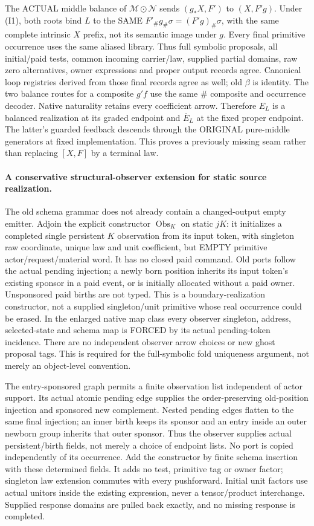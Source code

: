 \documentclass[11pt]{article}
\begin{document}
The ACTUAL middle balance of $\mathcal M\odot\mathcal N$ sends $(g_*X,F')$ to $(X,F'g)$. Under (I1), both roots bind $L$ to the SAME $F'_\#g_\#\sigma=(F'g)_\#\sigma$, with the same complete intrinsic $X$ prefix, not its semantic image under $g$. Every final primitive occurrence uses the same aliased library. Thus full symbolic proposals, all initial/paid tests, common incoming carrier/law, supplied partial domains, raw zero alternatives, owner expressions and proper output records agree. Canonical loop registries derived from those final records agree as well; old $\beta$ is identity. The two balance routes for a composite $g'f$ use the same $\#$ composite and occurrence decoder. Native naturality retains every coefficient arrow. Therefore $E_L$ is a balanced realization at its graded endpoint and $\overline E_L$ at the fixed proper endpoint. The latter's guarded feedback descends through the ORIGINAL pure-middle generators at fixed implementation. This proves a previously missing seam rather than replacing $[X,F]$ by a terminal law.

\paragraph{A conservative structural-observer extension for static source realization.}
The old schema grammar does not already contain a changed-output empty emitter. Adjoin the explicit constructor $\operatorname{Obs}_K$ on static $jK$: it initializes a completed single persistent $K$ observation from its input token, with singleton raw coordinate, unique law and unit coefficient, but EMPTY primitive actor/request/material word. It has no closed paid command. Old ports follow the actual pending injection; a newly born position inherits its input token's existing sponsor in a paid event, or is initially allocated without a paid owner. Unsponsored paid births are not typed. This is a boundary-realization constructor, not a supplied singleton/unit primitive whose real occurrence could be erased. In the enlarged native map class every observer singleton, address, selected-state and schema map is FORCED by its actual pending-token incidence. There are no independent observer arrow choices or new ghost proposal tags. This is required for the full-symbolic fold uniqueness argument, not merely an object-level convention.

The entry-sponsored graph permits a finite observation list independent of actor support. Its actual atomic pending edge supplies the order-preserving old-position injection and sponsored new complement. Nested pending edges flatten to the same final injection; an inner birth keeps its sponsor and an entry inside an outer newborn group inherits that outer sponsor. Thus the observer supplies actual persistent/birth fields, not merely a choice of endpoint lists. No port is copied independently of its occurrence. Add the constructor by finite schema insertion with these determined fields. It adds no test, primitive tag or owner factor; singleton law extension commutes with every pushforward. Initial unit factors use actual unitors inside the existing expression, never a tensor/product interchange. Supplied response domains are pulled back exactly, and no missing response is completed.
\end{document}
